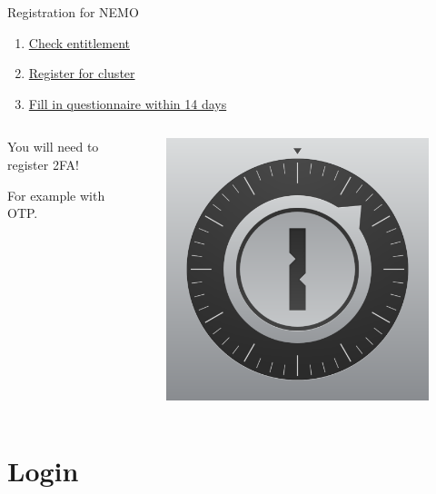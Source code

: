 \documentclass{beamer}
\begin{document}
\begin{frame}{Registration for NEMO}


\begin{enumerate}
    \item \href{https://wiki.bwhpc.de/e/Registration/bwUniCluster/Entitlement}{Check entitlement}
    \item \href{https://wiki.bwhpc.de/e/Registration/bwUniCluster/Service}{Register for cluster}
    \item \href{https://wiki.bwhpc.de/e/Registration/bwUniCluster/Questionnaire}{Fill in questionnaire within 14 days}
    
\end{enumerate}


\begin{columns}[onlytextwidth] 
  \begin{column}{0.5\textwidth}
      You will need to register 2FA!  
      
      For example with OTP.
      \end{column}
    \hspace{0.02\textwidth} %
    \begin{column}{0.5\textwidth}
      \begin{figure}
        \centering
        \includegraphics[width=0.3\linewidth]{figures/OTP.png}
    \end{figure}
\end{column}
\end{columns}

  


\end{frame}


\section{Login}
\end{document}

